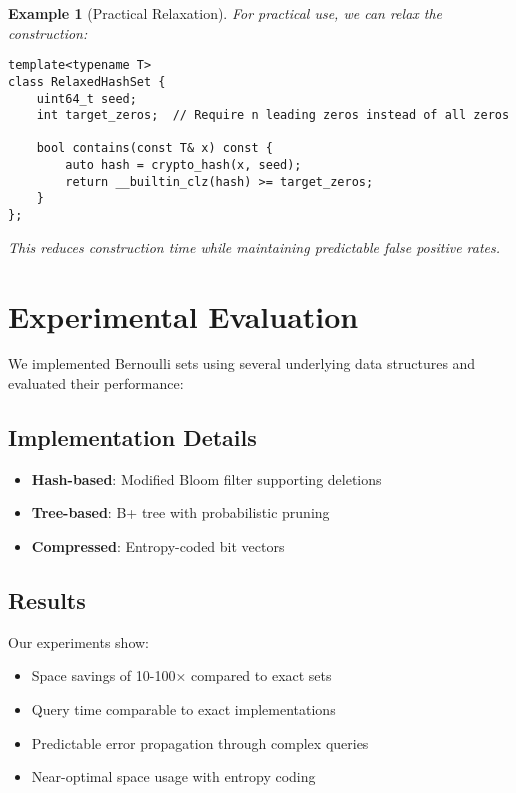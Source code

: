 \documentclass[11pt,final,hidelinks]{article}
\newtheorem{example}[theorem]{Example}
\begin{document}
\begin{example}[Practical Relaxation]
For practical use, we can relax the construction:
\begin{verbatim}
template<typename T>
class RelaxedHashSet {
    uint64_t seed;
    int target_zeros;  // Require n leading zeros instead of all zeros
    
    bool contains(const T& x) const {
        auto hash = crypto_hash(x, seed);
        return __builtin_clz(hash) >= target_zeros;
    }
};
\end{verbatim}
This reduces construction time while maintaining predictable false positive rates.
\end{example}

\section{Experimental Evaluation}

We implemented Bernoulli sets using several underlying data structures and evaluated their performance:

\subsection{Implementation Details}

\begin{itemize}
    \item \textbf{Hash-based}: Modified Bloom filter supporting deletions
    \item \textbf{Tree-based}: B+ tree with probabilistic pruning
    \item \textbf{Compressed}: Entropy-coded bit vectors
\end{itemize}

\subsection{Results}

Our experiments show:
\begin{itemize}
    \item Space savings of 10-100× compared to exact sets
    \item Query time comparable to exact implementations
    \item Predictable error propagation through complex queries
    \item Near-optimal space usage with entropy coding
\end{itemize}
\end{document}
